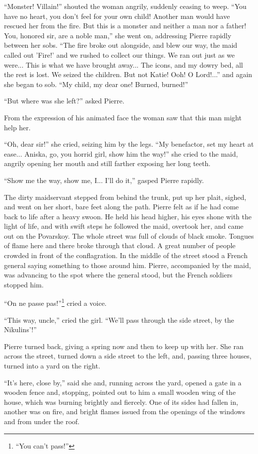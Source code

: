 ``Monster! Villain!'' shouted the woman angrily, suddenly ceasing
to weep.  ``You have no heart, you don't feel for your own child!
Another man would have rescued her from the fire. But this is a
monster and neither a man nor a father! You, honored sir, are a
noble man,'' she went on, addressing Pierre rapidly between her
sobs. ``The fire broke out alongside, and blew our way, the maid
called out 'Fire!' and we rushed to collect our things. We ran
out just as we were... This is what we have brought away... The
icons, and my dowry bed, all the rest is lost.  We seized the
children. But not Katie! Ooh! O Lord!...'' and again she began to
sob. ``My child, my dear one! Burned, burned!''

``But where was she left?'' asked Pierre.

From the expression of his animated face the woman saw that this
man might help her.

``Oh, dear sir!'' she cried, seizing him by the legs. ``My
benefactor, set my heart at ease... Aniska, go, you horrid girl,
show him the way!'' she cried to the maid, angrily opening her
mouth and still farther exposing her long teeth.

``Show me the way, show me, I... I'll do it,'' gasped Pierre
rapidly.

The dirty maidservant stepped from behind the trunk, put up her
plait, sighed, and went on her short, bare feet along the
path. Pierre felt as if he had come back to life after a heavy
swoon. He held his head higher, his eyes shone with the light of
life, and with swift steps he followed the maid, overtook her,
and came out on the Povarskoy. The whole street was full of
clouds of black smoke. Tongues of flame here and there broke
through that cloud. A great number of people crowded in front of
the conflagration. In the middle of the street stood a French
general saying something to those around him. Pierre, accompanied
by the maid, was advancing to the spot where the general stood,
but the French soldiers stopped him.

``On ne passe pas!''\footnote{``You can't pass!''} cried a voice.

``This way, uncle,'' cried the girl. ``We'll pass through the
side street, by the Nikulins'!''

Pierre turned back, giving a spring now and then to keep up with
her.  She ran across the street, turned down a side street to the
left, and, passing three houses, turned into a yard on the right.

``It's here, close by,'' said she and, running across the yard,
opened a gate in a wooden fence and, stopping, pointed out to him
a small wooden wing of the house, which was burning brightly and
fiercely. One of its sides had fallen in, another was on fire,
and bright flames issued from the openings of the windows and
from under the roof.

